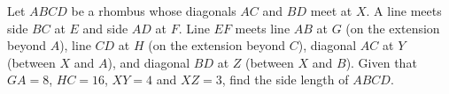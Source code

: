 Let $ABCD$ be a rhombus whose diagonals $AC$ and $BD$ meet at $X$. A line meets side $BC$ at $E$ and side $AD$ at $F$. Line $EF$ meets line $AB$ at $G$ (on the extension beyond $A$), line $CD$ at $H$ (on the extension beyond $C$), diagonal $AC$ at $Y$ (between $X$ and $A$), and diagonal $BD$ at $Z$ (between $X$ and $B$). Given that $GA=8$, $HC=16$, $XY=4$ and $XZ=3$, find the side length of $ABCD$.
